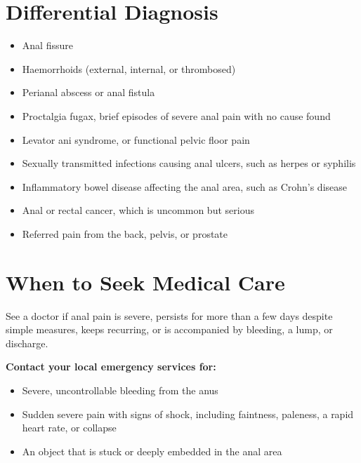 \section*{Differential Diagnosis}
\begin{itemize}
    \item Anal fissure
    \item Haemorrhoids (external, internal, or thrombosed)
    \item Perianal abscess or anal fistula
    \item Proctalgia fugax, brief episodes of severe anal pain with no cause found
    \item Levator ani syndrome, or functional pelvic floor pain
    \item Sexually transmitted infections causing anal ulcers, such as herpes or syphilis
    \item Inflammatory bowel disease affecting the anal area, such as Crohn's disease
    \item Anal or rectal cancer, which is uncommon but serious
    \item Referred pain from the back, pelvis, or prostate
\end{itemize}

\section*{When to Seek Medical Care}
See a doctor if anal pain is severe, persists for more than a few days despite simple measures, keeps recurring, or is accompanied by bleeding, a lump, or discharge.

\textbf{Contact your local emergency services for:}
\begin{itemize}
    \item Severe, uncontrollable bleeding from the anus
    \item Sudden severe pain with signs of shock, including faintness, paleness, a rapid heart rate, or collapse
    \item An object that is stuck or deeply embedded in the anal area
\end{itemize}

